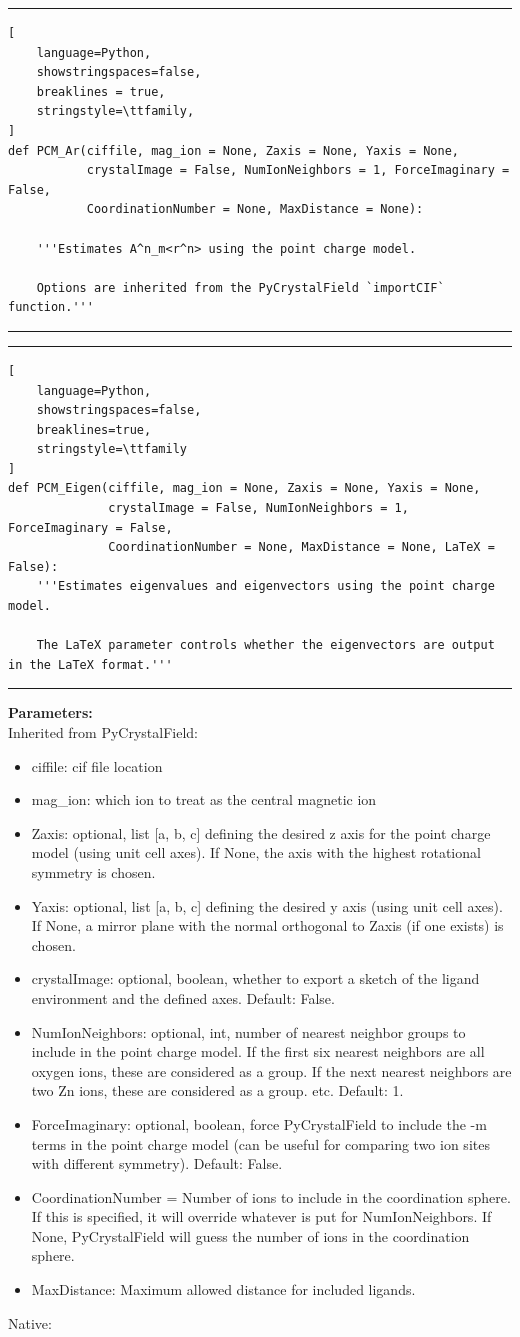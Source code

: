 \documentclass{article}
\begin{document}
\hrule
\begin{lstlisting}[
    language=Python, 
    showstringspaces=false, 
    breaklines = true,
    stringstyle=\ttfamily,
]
def PCM_Ar(ciffile, mag_ion = None, Zaxis = None, Yaxis = None, 
           crystalImage = False, NumIonNeighbors = 1, ForceImaginary = False, 
           CoordinationNumber = None, MaxDistance = None):
    
    '''Estimates A^n_m<r^n> using the point charge model.

    Options are inherited from the PyCrystalField `importCIF` function.'''
\end{lstlisting}
\hrule
\bigskip
\hrule
\begin{lstlisting}[
    language=Python, 
    showstringspaces=false, 
    breaklines=true,
    stringstyle=\ttfamily
]
def PCM_Eigen(ciffile, mag_ion = None, Zaxis = None, Yaxis = None,
              crystalImage = False, NumIonNeighbors = 1, ForceImaginary = False,
              CoordinationNumber = None, MaxDistance = None, LaTeX = False):
    '''Estimates eigenvalues and eigenvectors using the point charge model.
    
    The LaTeX parameter controls whether the eigenvectors are output in the LaTeX format.'''
\end{lstlisting}
\hrule
\smallskip
{\textbf{Parameters:}} \\
Inherited from PyCrystalField: 
\begin{itemize}
\item ciffile: cif file location
\item mag\_ion: which ion to treat as the central magnetic ion
\item Zaxis: optional, list [a, b, c] defining the desired z axis for the point charge model (using unit cell axes). If None, the axis with the highest rotational symmetry is chosen.
\item Yaxis: optional, list [a, b, c] defining the desired y axis (using unit cell axes). If None, a mirror plane with the normal orthogonal to Zaxis (if one exists) is chosen.
\item crystalImage: optional, boolean, whether to export a sketch of the ligand environment and the defined axes. Default: False.
\item NumIonNeighbors: optional, int, number of nearest neighbor groups to include in the point charge model. If the first six nearest neighbors are all oxygen ions, these are considered as a group. If the next nearest neighbors are two Zn ions, these are considered as a group. etc. Default: 1.
\item ForceImaginary: optional, boolean, force PyCrystalField to include the -m terms in the point charge model (can be useful for comparing two ion sites with different symmetry). Default: False.
\item CoordinationNumber = Number of ions to include in the coordination sphere. If this is specified, it will override whatever is put for NumIonNeighbors. If None, PyCrystalField will guess the number of ions in the coordination sphere.
\item MaxDistance: Maximum allowed distance for included ligands.
\end{itemize}
Native:
\end{document}
